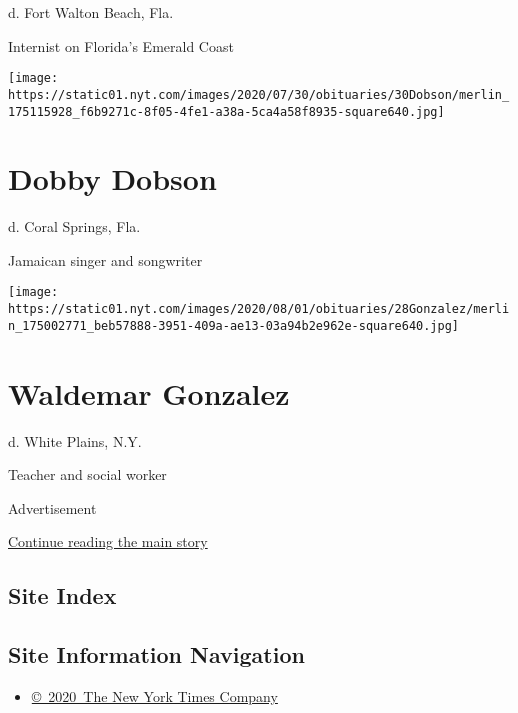 d. Fort Walton Beach, Fla.

Internist on Florida's Emerald Coast

\texttt{[image: https://static01.nyt.com/images/2020/07/30/obituaries/30Dobson/merlin\_175115928\_f6b9271c-8f05-4fe1-a38a-5ca4a58f8935-square640.jpg]}

\hypertarget{dobby-dobson}{%
\section{Dobby Dobson}\label{dobby-dobson}}

d. Coral Springs, Fla.

Jamaican singer and songwriter

\texttt{[image: https://static01.nyt.com/images/2020/08/01/obituaries/28Gonzalez/merlin\_175002771\_beb57888-3951-409a-ae13-03a94b2e962e-square640.jpg]}

\hypertarget{waldemar-gonzalez}{%
\section{Waldemar Gonzalez}\label{waldemar-gonzalez}}

d. White Plains, N.Y.

Teacher and social worker

Advertisement

\protect\hyperlink{after-bottom}{Continue reading the main story}

\hypertarget{site-index}{%
\subsection{Site Index}\label{site-index}}

\hypertarget{site-information-navigation}{%
\subsection{Site Information
Navigation}\label{site-information-navigation}}

\begin{itemize}
\tightlist
\item
  \href{https://help.nytimes.com/hc/en-us/articles/115014792127-Copyright-notice}{©~2020~The
  New York Times Company}
\end{itemize}

